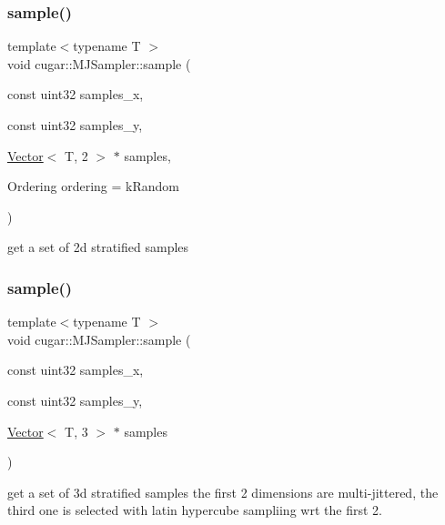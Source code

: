 \subsubsection{\texorpdfstring{sample()}{sample()}\hspace{0.1cm}{\footnotesize\ttfamily [1/3]}}
{\footnotesize\ttfamily template$<$typename T $>$ \\
void cugar\+::\+M\+J\+Sampler\+::sample (\begin{DoxyParamCaption}\item[{const uint32}]{samples\+\_\+x,  }\item[{const uint32}]{samples\+\_\+y,  }\item[{\hyperlink{structcugar_1_1_vector}{Vector}$<$ T, 2 $>$ $\ast$}]{samples,  }\item[{Ordering}]{ordering = {\ttfamily kRandom} }\end{DoxyParamCaption})}

get a set of 2d stratified samples \mbox{\label{structcugar_1_1_m_j_sampler_acada4f8e1f19e41b41700c831d09d3d2}} 
\subsubsection{\texorpdfstring{sample()}{sample()}\hspace{0.1cm}{\footnotesize\ttfamily [2/3]}}
{\footnotesize\ttfamily template$<$typename T $>$ \\
void cugar\+::\+M\+J\+Sampler\+::sample (\begin{DoxyParamCaption}\item[{const uint32}]{samples\+\_\+x,  }\item[{const uint32}]{samples\+\_\+y,  }\item[{\hyperlink{structcugar_1_1_vector}{Vector}$<$ T, 3 $>$ $\ast$}]{samples }\end{DoxyParamCaption})}

get a set of 3d stratified samples the first 2 dimensions are multi-\/jittered, the third one is selected with latin hypercube sampliing wrt the first 2. \mbox{\label{structcugar_1_1_m_j_sampler_a0794bef05d321470e0733fe5e3b66266}} 
